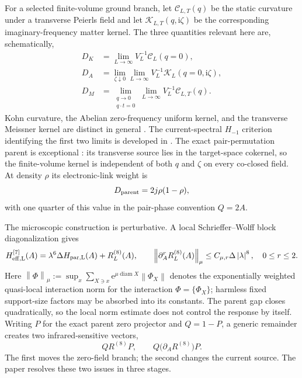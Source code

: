 \documentclass[11pt]{article}
\theoremstyle{definition}
\theoremstyle{remark}
\newcommand{\cK}{\mathcal K}
\newcommand{\cC}{\mathcal C}
\newcommand{\I}{\mathrm i}
\newcommand{\e}{\mathrm e}
\newcommand{\norm}[1]{\left\lVert #1\right\rVert}
\newcommand{\abs}[1]{\left\lvert #1\right\rvert}
\begin{document}
For a selected finite-volume ground branch, let $\cC_{L,T}(q)$ be the static
curvature under a transverse Peierls field and let
$\cK_{L,T}(q,\I\zeta)$ be the corresponding imaginary-frequency matter
kernel.  The three quantities relevant here are, schematically,
\begin{align}
 D_K&=\lim_{L\to\infty}V_L^{-1}\cC_L(q=0),
 \label{eq:DK-def}\\
 D_A&=\lim_{\zeta\downarrow0}\lim_{L\to\infty}
 V_L^{-1}\cK_L(q=0,\I\zeta),
 \label{eq:DA-def}\\
 D_M&=\lim_{\substack{q\to0\\q\cdot t=0}}\lim_{L\to\infty}
 V_L^{-1}\cC_{L,T}(q).
 \label{eq:DM-def}
\end{align}
Kohn curvature, the Abelian zero-frequency uniform kernel, and the transverse
Meissner kernel are distinct in general \cite{Kohn1964,Scalapino1993}.  The
current-spectral $H_{-1}$ criterion identifying the first two limits is developed
in \cite{SledgianowskiDynamic}.  The exact pair-permutation parent is
exceptional \cite{SledgianowskiMeissner}: its transverse source lies in the
target-space cokernel, so the finite-volume kernel is independent of both
$q$ and $\zeta$ on every co-closed field.  At density $\rho$ its electronic-link
weight is
\begin{equation}
 D_{\rm parent}=2j\rho(1-\rho),
 \label{eq:parent-weight}
\end{equation}
with one quarter of this value in the pair-phase convention $Q=2A$.

The microscopic construction is perturbative.  A local
Schrieffer--Wolff block diagonalization \cite{Bravyi2011,SledgianowskiMicro}
gives
\begin{equation}
 H_{\rm eff,L}^{[7]}(A)
 =\lambda^6\Delta H_{\rm par,L}(A)+R_L^{(8)}(A),
 \qquad
 \norm{\partial_A^rR_L^{(8)}(A)}_\mu
 \le C_{\mu,r}\Delta\abs\lambda^8,
 \quad 0\le r\le2.
 \label{eq:existing-sw}
\end{equation}
Here $\norm{\Phi}_\mu:=\sup_x\sum_{X\ni x}
\e^{\mu\operatorname{diam}X}\norm{\Phi_X}$ denotes the exponentially weighted
quasi-local interaction norm for the interaction $\Phi=\{\Phi_X\}$; harmless
fixed support-size factors may be absorbed into its constants.  The parent gap
closes quadratically, so the local norm estimate does not control the response
by itself.  Writing $P$ for the exact parent zero projector and
$Q=1-P$, a generic remainder creates two infrared-sensitive vectors,
\begin{equation}
 Q R^{(8)}P,
 \qquad
 Q\bigl(\partial_A R^{(8)}\bigr)P.
 \label{eq:two-sources}
\end{equation}
The first moves the zero-field branch; the second changes the current source.
The paper resolves these two issues in three stages.
\end{document}
